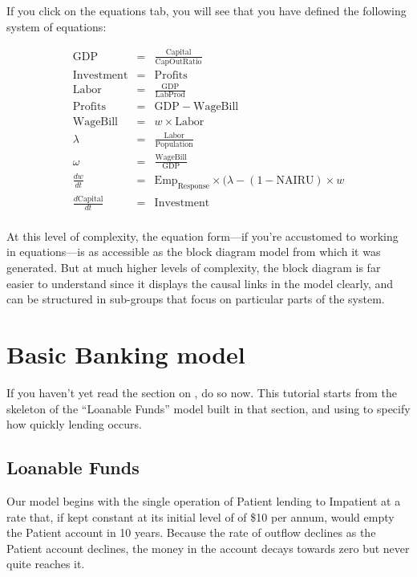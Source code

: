 If you click on the equations tab, you will see that you have defined the following system of
equations:

\begin{eqnarray*}
\mathrm{GDP}&=&\frac{\mathrm{Capital}}{\mathrm{CapOutRatio}}\\
\mathrm{Investment}&=&\mathrm{Profits}\\
\mathrm{Labor}&=&\frac{\mathrm{GDP}}{\mathrm{LabProd}}\\
\mathrm{Profits}&=&\mathrm{GDP}-\mathrm{WageBill}\\
\mathrm{WageBill}&=&w\times\mathrm{Labor}\\
\lambda&=&\frac{\mathrm{Labor}}{\mathrm{Population}}\\
\omega&=&\frac{\mathrm{WageBill}}{\mathrm{GDP}}\\
\frac{dw}{dt}&=&\mathrm{Emp}_\mathrm{Response}\times(\lambda-(1-\mathrm{NAIRU})
        \times w\\
\frac{d\mathrm{Capital}}{dt}&=&\mathrm{Investment}\\
\end{eqnarray*}


At this level of complexity, the equation form---if you're accustomed
to working in equations---is as accessible as the block diagram model from
which it was generated. But at much higher levels of complexity, the
block diagram is far easier to understand since it displays the causal
links in the model clearly, and can be structured in sub-groups that
focus on particular parts of the system. 

\section{Basic Banking model}\label{tut:basicBankModel}

If you haven't yet read the section on , do so now. This tutorial starts from the
skeleton of the ``Loanable Funds'' model built in that section, and
using  to specify how quickly
lending occurs.  


\subsection{Loanable Funds}

Our model begins with the single operation of Patient lending to
Impatient at a rate that, if kept constant at its initial level of of
\$10 per annum, would empty the Patient account in 10 years. Because
the rate of outflow declines as the Patient account declines, the
money in the account decays towards zero but never quite reaches it.

